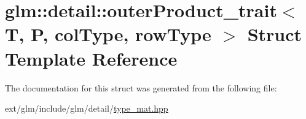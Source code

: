 \hypertarget{structglm_1_1detail_1_1outer_product__trait}{\section{glm\-:\-:detail\-:\-:outer\-Product\-\_\-trait$<$ T, P, col\-Type, row\-Type $>$ Struct Template Reference}
\label{structglm_1_1detail_1_1outer_product__trait}
}


The documentation for this struct was generated from the following file\-:\begin{DoxyCompactItemize}
\item 
ext/glm/include/glm/detail/\hyperlink{type__mat_8hpp}{type\-\_\-mat.\-hpp}\end{DoxyCompactItemize}
